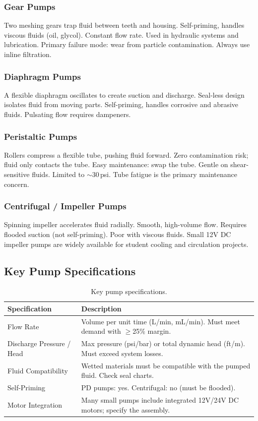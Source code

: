 \subsubsection{Gear Pumps}
Two meshing gears trap fluid between teeth and housing. Self-priming, handles viscous fluids (oil, glycol). Constant flow rate. Used in hydraulic systems and lubrication. Primary failure mode: wear from particle contamination. Always use inline filtration.

\subsubsection{Diaphragm Pumps}
A flexible diaphragm oscillates to create suction and discharge. Seal-less design isolates fluid from moving parts. Self-priming, handles corrosive and abrasive fluids. Pulsating flow requires dampeners.

\subsubsection{Peristaltic Pumps}
Rollers compress a flexible tube, pushing fluid forward. Zero contamination risk; fluid only contacts the tube. Easy maintenance: swap the tube. Gentle on shear-sensitive fluids. Limited to $\sim$30\,psi. Tube fatigue is the primary maintenance concern.

\subsubsection{Centrifugal / Impeller Pumps}
Spinning impeller accelerates fluid radially. Smooth, high-volume flow. Requires flooded suction (not self-priming). Poor with viscous fluids. Small 12V DC impeller pumps are widely available for student cooling and circulation projects.



\subsection{Key Pump Specifications}

\begin{table}[htbp]
\centering\small
\begin{tabularx}{\textwidth}{l X}
  \toprule
  \textbf{Specification} & \textbf{Description} \\
  \midrule
  Flow Rate & Volume per unit time (L/min, mL/min). Must meet demand with $\geq$25\% margin. \\
  Discharge Pressure / Head & Max pressure (psi/bar) or total dynamic head (ft/m). Must exceed system losses. \\
  Fluid Compatibility & Wetted materials must be compatible with the pumped fluid. Check seal charts. \\
  Self-Priming & PD pumps: yes. Centrifugal: no (must be flooded). \\
  Motor Integration & Many small pumps include integrated 12V/24V DC motors; specify the assembly. \\
  \bottomrule
\end{tabularx}
\caption{Key pump specifications.}
\end{table}


